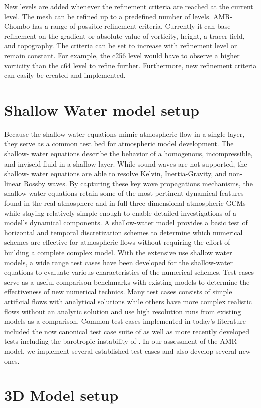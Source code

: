     New levels are added whenever the refinement criteria are reached at the current level.  The mesh can be refined up to a predefined number of levels.   AMR-Chombo has a range of possible refinement criteria.  Currently it can base refinement on the gradient or absolute value of vorticity, height, a tracer field, and topography.    The criteria can be set to increase with refinement level or remain constant.  For example, the c256 level would have to observe a higher vorticity than the c64 level to refine further.  Furthermore, new refinement criteria can easily be created and implemented. 
    
\section{Shallow Water model setup}


Because the shallow-water equations mimic atmospheric flow in a single layer, 
they serve as a common test bed for atmospheric model development. The shallow-
water equations describe the behavior of a homogenous, incompressible, 
and inviscid fluid in a shallow layer. While sound waves are not supported, the shallow-
water equations are able to resolve Kelvin, Inertia-Gravity, and non-linear 
Rossby waves. By capturing these key wave 
propagations mechanisms, the shallow-water equations retain some of the
most pertinent dynamical features found in the real atmosphere and in 
full three dimensional atmospheric GCMs while staying relatively simple enough to enable 
detailed investigations of a model's dynamical components. A shallow-water model provides
a basic test of horizontal and temporal discretization schemes to determine which numerical
schemes are effective for atmospheric flows without requiring the effort of building a complete
complex model. With the extensive use shallow water models, a wide range test cases have
been developed for the shallow-water equations to evaluate various characteristics of the numerical
schemes. Test cases serve as a useful comparison benchmarks with existing models to 
determine the effectiveness of new numerical technics.
Many test cases consists of simple artificial 
flows with analytical solutions while others have more complex realistic flows without 
an analytic solution and use high resolution runs from existing models as a comparison.
Common test cases implemented in today's literature included
the now canonical test case suite of \cite{Williamson:1992kx} as well as more recently
developed tests including the barotropic instability of \cite{Galewsky:2004uq}. In
our assessment of the AMR model, we implement several established test cases and also
develop several new ones.


\section{3D Model setup}
